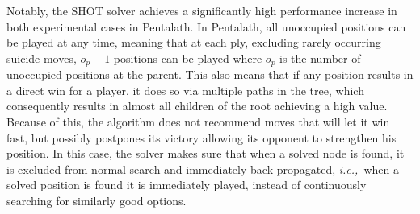 \documentclass{icga}
\newcommand{\ie}{{\it i.e.,}~}
\begin{document}
Notably, the SHOT solver achieves a significantly high performance increase in both experimental cases in Pentalath. In Pentalath, all unoccupied positions can be played at any time, meaning that at each ply, excluding rarely occurring suicide moves, $o_p-1$ positions can be played where $o_p$ is the number of unoccupied positions at the parent. This also means that if any position results in a direct win for a player, it does so via multiple paths in the tree, which consequently results in almost all children of the root achieving a high value. Because of this, the algorithm does not recommend moves that will let it win fast, but possibly postpones its victory allowing its opponent to strengthen his position. In this case, the solver makes sure that when a solved node is found, it is excluded from normal search and immediately back-propagated, \ie when a solved position is found it is immediately played, instead of continuously searching for similarly good options.

\begin{table}[t]
\centering
\captionsetup{justification=centering,margin=1cm}
\tabcolsep=0.3cm
\vspace{3mm}
{\caption[H-MCTS Solver vs. MCTS-Solver.]{H-MCTS Solver vs. MCTS-Solver, random play-outs.\\ Win percentages with respect to H-MCTS, 2,000 games.} \label{tab:uct-s_hmcts-s}}
\end{table}
\end{document}
